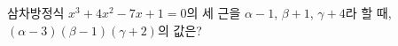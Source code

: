 삼차방정식 $x^3+4x^2-7x+1=0$의 세 근을 $\alpha-1$, $\beta+1$, $\gamma+4$라 할 때, $(\alpha-3)(\beta-1)(\gamma+2)$의 값은?
